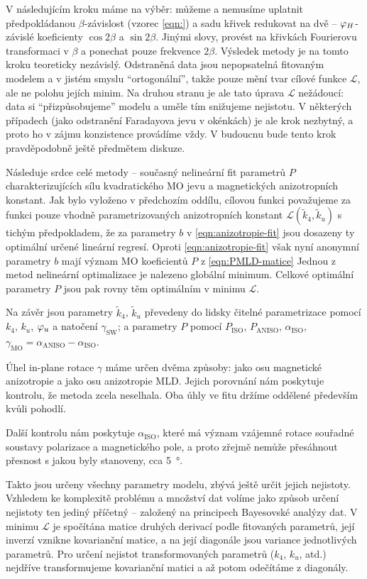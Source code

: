 V následujícím kroku máme na výběr: můžeme a nemusíme uplatnit předpokládanou $\beta$-závislost (vzorec \eqref{eqn:}) a sadu křivek redukovat na dvě -- $\varphi_H$-závislé koeficienty $\cos2\beta$ a $\sin2\beta$.
Jinými slovy, provést na křivkách Fourierovu transformaci v $\beta$ a ponechat pouze frekvence $2\beta$.
Výsledek metody je na tomto kroku teoreticky nezávislý.
Odstraněná data jsou nepopsatelná fitovaným modelem a v jistém smyslu ``ortogonální'', takže pouze mění tvar cílové funkce $\mathcal{L}$, ale ne polohu jejích minim.
Na druhou stranu je ale tato úprava $\mathcal{L}$ nežádoucí: data si ``přizpůsobujeme'' modelu a uměle tím snižujeme nejistotu.
V některých případech (jako odstranění Faradayova jevu v okénkách) je ale krok nezbytný, a proto ho v zájmu konzistence provádíme vždy.
V budoucnu bude tento krok pravděpodobně ještě předmětem diskuze.

Následuje srdce celé metody -- současný nelineární fit parametrů $P$ charakterizujících sílu kvadratického MO jevu a magnetických anizotropních konstant.
Jak bylo vyloženo v předchozím oddílu, cílovou funkci považujeme za funkci pouze vhodně parametrizovaných anizotropních konstant $\mathcal{L}(\tilde{k}_4, \tilde{k}_u)$ s tichým předpokladem, že za parametry $b$ v \eqref{eqn:anizotropie-fit} jsou dosazeny ty optimální určené lineární regresí.
Oproti \eqref{eqn:anizotropie-fit} však nyní anonymní parametry $b$ mají význam MO koeficientů $P$ z \eqref{eqn:PMLD-matice}
Jednou z metod nelineární optimalizace je nalezeno globální minimum.
Celkové optimální parametry $P$ jsou pak rovny těm optimálním v minimu $\mathcal{L}$.

Na závěr jsou parametry $\tilde{k}_4$, $\tilde{k}_u$ převedeny do lidsky čitelné parametrizace pomocí $k_4$, $k_u$, $\varphi_u$ a natočení $\gamma_\textrm{SW}$; a parametry $P$ pomocí $P_\textrm{ISO}$, $P_\textrm{ANISO}$, $\alpha_\textrm{ISO}$, $\gamma_\textrm{MO}=\alpha_\textrm{ANISO}-\alpha_\textrm{ISO}$.

Úhel in-plane rotace $\gamma$ máme určen dvěma způsoby: jako osu magnetické anizotropie a jako osu anizotropie MLD.
Jejich porovnání nám poskytuje kontrolu, že metoda zcela neselhala.
Oba úhly ve fitu držíme oddělené především kvůli pohodlí.

Další kontrolu nám poskytuje $\alpha_\textrm{ISO}$, které má význam vzájemné rotace souřadné soustavy polarizace a magnetického pole, a proto zřejmě nemůže přesáhnout přesnost s jakou byly stanoveny, cca \SI{5}{\degree}.

Takto jsou určeny všechny parametry modelu, zbývá ještě určit jejich nejistoty.
Vzhledem ke komplexitě problému a množství dat volíme jako způsob určení nejistoty ten jediný příčetný -- založený na principech Bayesovské analýzy dat\cite{gelmanBayesianDataAnalysis2014}.
V minimu $\mathcal{L}$ je spočítána matice druhých derivací podle fitovaných parametrů, její inverzí vznikne kovarianční matice, a na její diagonále jsou variance jednotlivých parametrů.
Pro určení nejistot transformovaných parametrů ($k_4$, $k_u$, atd.) nejdříve transformujeme kovarianční matici a až potom odečítáme z diagonály.
